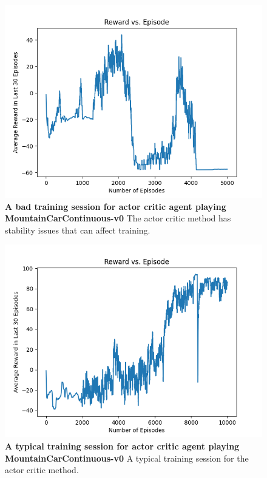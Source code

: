 \documentclass[conference]{IEEEtran}
\begin{document}
\begin{figure}[htbp]
\centerline{\includegraphics[scale=0.5]{bad_actor_critic_mcc.png}}
\caption{\textbf{A bad training session for actor critic agent playing MountainCarContinuous-v0}  The actor critic method has stability issues that can affect training.}
\label{fig:actorCriticBadTrainingMcc}
\end{figure}

\begin{figure}[htbp]
\centerline{\includegraphics[scale=0.5]{best_actor_critic_mcc.png}}
\caption{\textbf{A typical training session for actor critic agent playing MountainCarContinuous-v0}  A typical training session for the actor critic method.}
\label{fig:actorCriticGoodTrainingMcc}
\end{figure}
\end{document}
